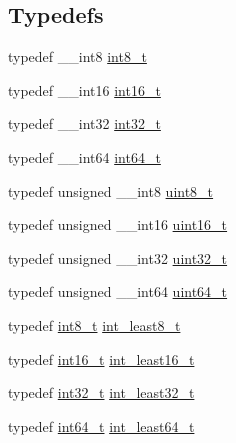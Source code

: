\subsection*{Typedefs}
\begin{DoxyCompactItemize}
\item 
typedef \+\_\+\+\_\+int8 \hyperlink{lib-src_2ffmpeg_2win32_2stdint_8h_a27eddd12ef1271a2ea8629e1148e7e63}{int8\+\_\+t}
\item 
typedef \+\_\+\+\_\+int16 \hyperlink{lib-src_2ffmpeg_2win32_2stdint_8h_a044293bfeff56852a28ed6c2cfbb2649}{int16\+\_\+t}
\item 
typedef \+\_\+\+\_\+int32 \hyperlink{lib-src_2ffmpeg_2win32_2stdint_8h_a37994e3b11c72957c6f454c6ec96d43d}{int32\+\_\+t}
\item 
typedef \+\_\+\+\_\+int64 \hyperlink{lib-src_2ffmpeg_2win32_2stdint_8h_a67a9885ef4908cb72ce26d75b694386c}{int64\+\_\+t}
\item 
typedef unsigned \+\_\+\+\_\+int8 \hyperlink{lib-src_2ffmpeg_2win32_2stdint_8h_a9a941819355e6f658991890ff66b4b0e}{uint8\+\_\+t}
\item 
typedef unsigned \+\_\+\+\_\+int16 \hyperlink{lib-src_2ffmpeg_2win32_2stdint_8h_a30af71eaf40c925c9832eb289a48da35}{uint16\+\_\+t}
\item 
typedef unsigned \+\_\+\+\_\+int32 \hyperlink{lib-src_2ffmpeg_2win32_2stdint_8h_a6eb1e68cc391dd753bc8ce896dbb8315}{uint32\+\_\+t}
\item 
typedef unsigned \+\_\+\+\_\+int64 \hyperlink{lib-src_2ffmpeg_2win32_2stdint_8h_aec6fcb673ff035718c238c8c9d544c47}{uint64\+\_\+t}
\item 
typedef \hyperlink{lib-src_2ffmpeg_2win32_2stdint_8h_a27eddd12ef1271a2ea8629e1148e7e63}{int8\+\_\+t} \hyperlink{lib-src_2ffmpeg_2win32_2stdint_8h_aadfd725efbf565422ab13db91ccca53c}{int\+\_\+least8\+\_\+t}
\item 
typedef \hyperlink{lib-src_2ffmpeg_2win32_2stdint_8h_a044293bfeff56852a28ed6c2cfbb2649}{int16\+\_\+t} \hyperlink{lib-src_2ffmpeg_2win32_2stdint_8h_a17f379713bed2a28ac431760401253cd}{int\+\_\+least16\+\_\+t}
\item 
typedef \hyperlink{lib-src_2ffmpeg_2win32_2stdint_8h_a37994e3b11c72957c6f454c6ec96d43d}{int32\+\_\+t} \hyperlink{lib-src_2ffmpeg_2win32_2stdint_8h_a2676b57a778795e5d0598970f1407f38}{int\+\_\+least32\+\_\+t}
\item 
typedef \hyperlink{lib-src_2ffmpeg_2win32_2stdint_8h_a67a9885ef4908cb72ce26d75b694386c}{int64\+\_\+t} \hyperlink{lib-src_2ffmpeg_2win32_2stdint_8h_a2073b30b3170d509bc756bf5c7862caf}{int\+\_\+least64\+\_\+t}

\end{DoxyCompactItemize}
